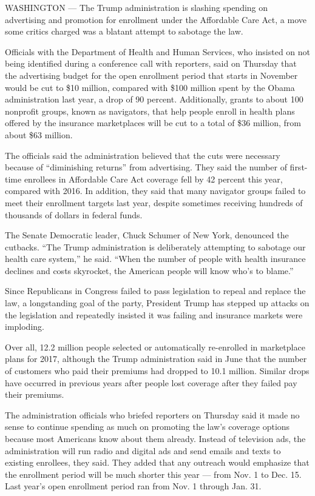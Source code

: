 WASHINGTON --- The Trump administration is slashing spending on
advertising and promotion for enrollment under the Affordable Care Act,
a move some critics charged was a blatant attempt to sabotage the law.

Officials with the Department of Health and Human Services, who insisted
on not being identified during a conference call with reporters, said on
Thursday that the advertising budget for the open enrollment period that
starts in November would be cut to \$10 million, compared with \$100
million spent by the Obama administration last year, a drop of 90
percent. Additionally, grants to about 100 nonprofit groups, known as
navigators, that help people enroll in health plans offered by the
insurance marketplaces will be cut to a total of \$36 million, from
about \$63 million.

The officials said the administration believed that the cuts were
necessary because of ``diminishing returns'' from advertising. They said
the number of first-time enrollees in Affordable Care Act coverage fell
by 42 percent this year, compared with 2016. In addition, they said that
many navigator groups failed to meet their enrollment targets last year,
despite sometimes receiving hundreds of thousands of dollars in federal
funds.

The Senate Democratic leader, Chuck Schumer of New York, denounced the
cutbacks. ``The Trump administration is deliberately attempting to
sabotage our health care system,'' he said. ``When the number of people
with health insurance declines and costs skyrocket, the American people
will know who's to blame.''

Since Republicans in Congress failed to pass legislation to repeal and
replace the law, a longstanding goal of the party, President Trump has
stepped up attacks on the legislation and repeatedly insisted it was
failing and insurance markets were imploding.

Over all, 12.2 million people selected or automatically re-enrolled in
marketplace plans for 2017, although the Trump administration said in
June that the number of customers who paid their premiums had dropped to
10.1 million. Similar drops have occurred in previous years after people
lost coverage after they failed pay their premiums.

The administration officials who briefed reporters on Thursday said it
made no sense to continue spending as much on promoting the law's
coverage options because most Americans know about them already. Instead
of television ads, the administration will run radio and digital ads and
send emails and texts to existing enrollees, they said. They added that
any outreach would emphasize that the enrollment period will be much
shorter this year --- from Nov. 1 to Dec. 15. Last year's open
enrollment period ran from Nov. 1 through Jan. 31.

